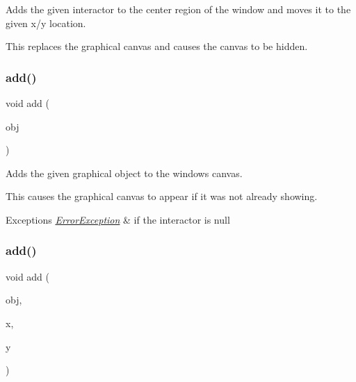Adds the given interactor to the center region of the window and moves it to the given x/y location. 

This replaces the graphical canvas and causes the canvas to be hidden. \mbox{\label{classGWindow_a2327d64402837eedd533c098014e46d9}} 
\subsubsection{\texorpdfstring{add()}{add()}\hspace{0.1cm}{\footnotesize\ttfamily [5/8]}}
{\footnotesize\ttfamily void add (\begin{DoxyParamCaption}\item[{\mbox{\hyperlink{classGObject}{G\+Object}} $\ast$}]{obj }\end{DoxyParamCaption})\hspace{0.3cm}{\ttfamily [virtual]}}



Adds the given graphical object to the window\textquotesingle{}s canvas. 

This causes the graphical canvas to appear if it was not already showing. 
\begin{DoxyExceptions}{Exceptions}
{\em \mbox{\hyperlink{classErrorException}{Error\+Exception}}} & if the interactor is null \\
\hline
\end{DoxyExceptions}
\mbox{\label{classGWindow_ab5388ece7a50b46e0ee72e11fe202609}} 
\subsubsection{\texorpdfstring{add()}{add()}\hspace{0.1cm}{\footnotesize\ttfamily [6/8]}}
{\footnotesize\ttfamily void add (\begin{DoxyParamCaption}\item[{\mbox{\hyperlink{classGObject}{G\+Object}} $\ast$}]{obj,  }\item[{double}]{x,  }\item[{double}]{y }\end{DoxyParamCaption})\hspace{0.3cm}{\ttfamily [virtual]}}



